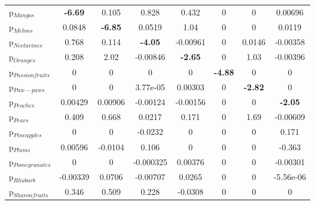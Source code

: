 \documentclass[11pt]{article}
\begin{document}
\begin{table}[h]
\begin{center}
\begin{tabular}{lccccccc}
p$_{Mangos}$ &\textbf{-6.69} &0.105 &0.828 &0.432 &0 &0 &0.00696 \\
p$_{Melons}$ &0.0848 &\textbf{-6.85} &0.0519 &1.04 &0 &0 &0.0119 \\
p$_{Nectarines}$ &0.768 &0.114 &\textbf{-4.05} &-0.00961 &0 &0.0146 &-0.00358 \\
p$_{Oranges}$ &0.208 &2.02 &-0.00846 &\textbf{-2.65} &0 &1.03 &-0.00396 \\
p$_{Passion fruits}$ &0 &0 &0 &0 &\textbf{-4.88} &0 &0 \\
p$_{Paw-paws}$ &0 &0 &3.77e-05 &0.00303 &0 &\textbf{-2.82} &0 \\
p$_{Peaches}$ &0.00429 &0.00906 &-0.00124 &-0.00156 &0 &0 &\textbf{-2.05} \\
p$_{Pears}$ &0.409 &0.668 &0.0217 &0.171 &0 &1.69 &-0.00609 \\
p$_{Pineapples}$ &0 &0 &-0.0232 &0 &0 &0 &0.171 \\
p$_{Plums}$ &0.00596 &-0.0104 &0.106 &0 &0 &0 &-0.363 \\
p$_{Pomegranates}$ &0 &0 &-0.000325 &0.00376 &0 &0 &-0.00301 \\
p$_{Rhubarb}$ &-0.00339 &0.0706 &-0.00707 &0.0265 &0 &0 &-5.56e-06 \\
p$_{Sharon fruits}$ &0.346 &0.509 &0.228 &-0.0308 &0 &0 &0 \\
\end{tabular}
\end{center}
\end{table}
\end{document}
